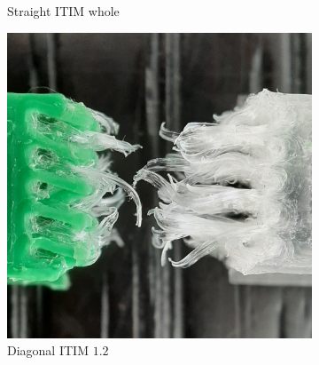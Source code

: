 \begin{figure}
\begin{subfigure}[B]{.28\columnwidth}
		\caption{Straight ITIM whole}
		\label{interlocking:fig:failures_whole}
	\end{subfigure}
	\begin{subfigure}[B]{.28\columnwidth}
		\centering
		\includegraphics[height=\figheight]{sources-testing-v1_cropped.jpg}
		\caption{Diagonal ITIM $1.2$}
		\label{interlocking:fig:failures_diagonal}
	\end{subfigure}
	\begin{subfigure}[B]{.18\columnwidth}
		\centering

\end{subfigure}
\end{figure}

